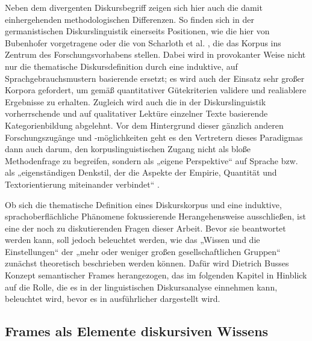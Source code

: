 Neben dem divergenten Diskursbegriff zeigen sich hier auch die damit einhergehenden methodologischen Differenzen. So finden sich in der germanistischen Diskurslinguistik einerseits Positionen, wie die hier von Bubenhofer vorgetragene oder die von Scharloth et al. \autocite*{scharlothWuchernRhizomeLinguistische2013}, die das Korpus ins Zentrum des Forschungsvorhabens stellen. Dabei wird in provokanter Weise nicht nur die thematische Diskursdefinition durch eine induktive, auf Sprachgebrauchsmustern basierende ersetzt; es wird auch der Einsatz sehr großer Korpora gefordert, um gemäß quantitativer Gütekriterien validere und realiablere Ergebnisse zu erhalten. Zugleich wird auch die in der Diskurslinguistik vorherrschende und auf qualitativer Lektüre einzelner Texte basierende Kategorienbildung abgelehnt. Vor dem Hintergrund dieser gänzlich anderen Forschungszugänge und -möglichkeiten geht es den Vertretern dieses Paradigmas dann auch darum, den korpuslinguistischen Zugang nicht als bloße Methodenfrage zu begreifen, sondern als „eigene Perspektive`` auf Sprache \autocite[2 unter Bezug auf Tognini-Bonelli 2001: 84]{perkuhnKorpuslinguistikUnbekannteWesen2006} bzw. als „eigenständigen Denkstil, der die Aspekte der Empirie, Quantität und Textorientierung miteinander verbindet`` \autocite[148]{bubenhoferKorpuslinguistischeDiskursanalyseNutzen2013}.

Ob sich die thematische Definition eines Diskurskorpus und eine induktive, sprachoberflächliche Phänomene fokussierende Herangehensweise ausschließen, ist eine der noch zu diskutierenden Fragen dieser Arbeit. Bevor sie beantwortet werden kann, soll jedoch beleuchtet werden, wie das „Wissen und die Einstellungen`` der „mehr oder weniger großen gesellschaftlichen Gruppen`` \autocite[28]{gardtDiskursanalyseAktuellerTheoretischer2007} zunächst theoretisch beschrieben werden können. Dafür wird Dietrich Busses \autocite*{busseFrameSemantikKompendium2012} Konzept semantischer Frames herangezogen, das im folgenden Kapitel in Hinblick auf die Rolle, die es in der linguistischen Diskursanalyse einnehmen kann, beleuchtet wird, bevor es in  ausführlicher dargestellt wird.

\subsection{Frames als Elemente diskursiven Wissens}\label{frames-als-elemente-diskursiven-wissens}

